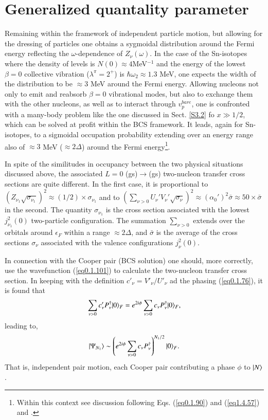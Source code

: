  \section{Generalized quantality parameter}\label{App1D}
 Remaining within the framework of independent particle motion, but allowing for the dressing of particles one obtains a sygmoidal distribution around the Fermi energy reflecting the $\omega$-dependence of $Z_\nu(\omega)$. In the case of the Sn-isotopes where the density of levels is $N(0)\approx 4$MeV$^{-1}$ and the energy of the lowest $\beta=0$ collective vibration ($\lambda^\pi=2^+$) is $\hbar\omega_2\approx1.3$ MeV, one expects the width of the distribution to be $\approx3$ MeV around the Fermi energy. Allowing nucleons not only to emit and reabsorb $\beta=0$ vibrational modes, but also to exchange them with the other nucleons, as well as to interact through $v_{p}^{bare}$, one is confronted with a many-body problem like the one discussed in Sect. \ref{S3.2}  fo $x\gg1/2$,  which can be solved at profit within the BCS framework. It leads, again for Sn-isotopes, to a sigmoidal occupation probability extending over an energy range also of $\approx 3$ MeV ($\approx 2\Delta$) around the Fermi energy\footnote{Within this context see discussion following Eqs. (\ref{eq0.1.90}) and (\ref{eq1.4.57}) and \cite{Tinkham:96}.}. 
 
 
 In spite of the similitudes in occupancy between the two physical situations discussed above, the associated $L=0$ (gs)$\to$(gs) two-nucleon transfer cross sections are quite different. In the first case, it is proportional to $(Z_{\nu_1}\sqrt{\sigma_{\nu_1}})^2\approx(1/2)\times\sigma_{\nu_1}$ and to $(\sum_{\nu>0}U_{\nu}'V_{\nu}'\sqrt{\sigma_\nu})^2\approx(\alpha_0')^2\bar\sigma\approx50\times\bar\sigma$ in the second. The quantity $\sigma_{\nu_1}$ is the cross section associated with the lowest $ j_{\nu_1}^2(0)$ two-particle configuration. The summation $\sum_{\nu>0}$ extends over the orbitals around $\epsilon_F$ within a range $\approx2\Delta$, and $\bar\sigma$ is the average of the cross sections $\sigma_\nu$ associated with the valence configurations $j^2_\nu(0)$.
 
 In connection with the Cooper pair (BCS solution) one should,
  more correctly, use the wavefunction (\ref{eq0.1.101}) to calculate the two-nucleon transfer cross section. In keeping with the definition $c'_\nu=V'_\nu/U'_\nu$ ad the phasing (\ref{eq0.1.76}), it is found that
\begin{align}\label{eq3.4.1}
	\sum_{\nu>0}c'_\nu P_\nu^\dagger|{0} \rangle_F=e^{2i\phi}\sum_{\nu>0}c_\nu P_\nu^\dagger|{0} \rangle_F,
\end{align}
leading to,
 \begin{align}\label{eq3.4.2}
|{\Psi_{N_1}} \rangle\sim\left(e^{2i\phi}\sum_{\nu>0}c_\nu P^\dagger_\nu\right)^{N_1/2}|{0} \rangle_F.
 \end{align}
 That is, independent pair motion, each Cooper pair contributing a phase $\phi$ to $|{N} \rangle$.
 
